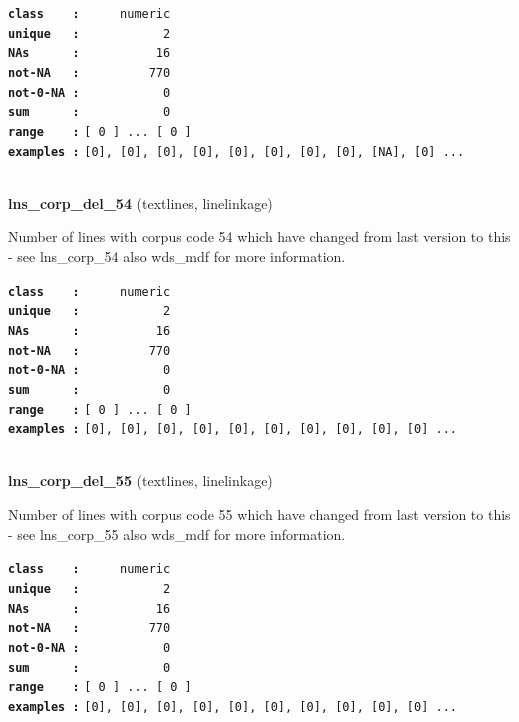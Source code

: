 \documentclass[]{article}
\begin{document}
\textbf{\texttt{class\ \ \ \ :}} \texttt{~~~~~numeric}\\
\textbf{\texttt{unique\ \ \ :}} \texttt{~~~~~~~~~~~2}\\
\textbf{\texttt{NAs\ \ \ \ \ \ :}} \texttt{~~~~~~~~~~16}\\
\textbf{\texttt{not-NA\ \ \ :}} \texttt{~~~~~~~~~770}\\
\textbf{\texttt{not-0-NA\ :}} \texttt{~~~~~~~~~~~0}\\
\textbf{\texttt{sum\ \ \ \ \ \ :}} \texttt{~~~~~~~~~~~0}\\
\textbf{\texttt{range\ \ \ \ :}}
\texttt{{[}\ 0\ {]}\ ...\ {[}\ 0\ {]}}\\
\textbf{\texttt{examples\ :}}
\texttt{{[}0{]},\ {[}0{]},\ {[}0{]},\ {[}0{]},\ {[}0{]},\ {[}0{]},\ {[}0{]},\ {[}0{]},\ {[}NA{]},\ {[}0{]}\ ...}\\

~

\textbf{lns\_corp\_del\_54} (textlines, linelinkage)

Number of lines with corpus code 54 which have changed from last version
to this - see lns\_corp\_54 also wds\_mdf for more information.

\textbf{\texttt{class\ \ \ \ :}} \texttt{~~~~~numeric}\\
\textbf{\texttt{unique\ \ \ :}} \texttt{~~~~~~~~~~~2}\\
\textbf{\texttt{NAs\ \ \ \ \ \ :}} \texttt{~~~~~~~~~~16}\\
\textbf{\texttt{not-NA\ \ \ :}} \texttt{~~~~~~~~~770}\\
\textbf{\texttt{not-0-NA\ :}} \texttt{~~~~~~~~~~~0}\\
\textbf{\texttt{sum\ \ \ \ \ \ :}} \texttt{~~~~~~~~~~~0}\\
\textbf{\texttt{range\ \ \ \ :}}
\texttt{{[}\ 0\ {]}\ ...\ {[}\ 0\ {]}}\\
\textbf{\texttt{examples\ :}}
\texttt{{[}0{]},\ {[}0{]},\ {[}0{]},\ {[}0{]},\ {[}0{]},\ {[}0{]},\ {[}0{]},\ {[}0{]},\ {[}0{]},\ {[}0{]}\ ...}\\

~

\textbf{lns\_corp\_del\_55} (textlines, linelinkage)

Number of lines with corpus code 55 which have changed from last version
to this - see lns\_corp\_55 also wds\_mdf for more information.

\textbf{\texttt{class\ \ \ \ :}} \texttt{~~~~~numeric}\\
\textbf{\texttt{unique\ \ \ :}} \texttt{~~~~~~~~~~~2}\\
\textbf{\texttt{NAs\ \ \ \ \ \ :}} \texttt{~~~~~~~~~~16}\\
\textbf{\texttt{not-NA\ \ \ :}} \texttt{~~~~~~~~~770}\\
\textbf{\texttt{not-0-NA\ :}} \texttt{~~~~~~~~~~~0}\\
\textbf{\texttt{sum\ \ \ \ \ \ :}} \texttt{~~~~~~~~~~~0}\\
\textbf{\texttt{range\ \ \ \ :}}
\texttt{{[}\ 0\ {]}\ ...\ {[}\ 0\ {]}}\\
\textbf{\texttt{examples\ :}}
\texttt{{[}0{]},\ {[}0{]},\ {[}0{]},\ {[}0{]},\ {[}0{]},\ {[}0{]},\ {[}0{]},\ {[}0{]},\ {[}0{]},\ {[}0{]}\ ...}\\
\end{document}
